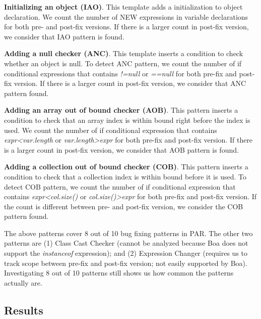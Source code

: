 \documentclass{sig-alternate-05-2015}
\begin{document}
\vspace{1ex}
\noindent
{\bf Initializing an object (IAO)}. This template adds a initialization to object
declaration.  We count the number of NEW expressions in variable declarations
for both pre- and post-fix versions. If there is a larger count in post-fix
version, we consider that IAO pattern is found.

\vspace{1ex}
\noindent
 {\bf Adding a null checker (ANC)}.  This template inserts a condition to check whether an
    object is null.
  To detect ANC pattern, we count the number of if conditional expressions that
  contains {\em !=null} or {\em ==null} for both pre-fix and post-fix
  version. If there is a larger count in post-fix version,
  we consider that ANC pattern found.

\vspace{1ex}
\noindent
 {\bf Adding an array out of bound checker (AOB)}. This pattern inserts a condition to check that an array
    index is within bound right before the index is used.
 We count the number of if conditional expression that
  contains {\em expr<var.length} or {\em var.length>expr} for both pre-fix and
  post-fix version. If there is a larger count in post-fix version, we consider that AOB pattern is found.

\vspace{1ex}
\noindent
 {\bf Adding a collection out of bound checker (COB)}.  This pattern inserts a condition to check that a
    collection index is within bound before it is used.
To detect COB pattern, we count the number of if conditional expression that
contains {\em expr<col.size()} or {\em col.size()>expr} for both pre-fix and
post-fix version. If the count is different between pre- and post-fix
version, we consider the COB pattern found.

\vspace{1ex} The above patterns cover 8 out of 10 bug fixing patterns in
PAR. The other two patterns are (1) Class Cast Checker (cannot be analyzed because
Boa does not support the {\em instanceof} expression); and (2) Expression Changer (requires us to track scope between pre-fix and post-fix version; not
easily supported by Boa). Investigating 8 out of
10 patterns still shows us how common the patterns actually are.

\subsection{Results} \label{sec:freqfixpattern}
\end{document}
